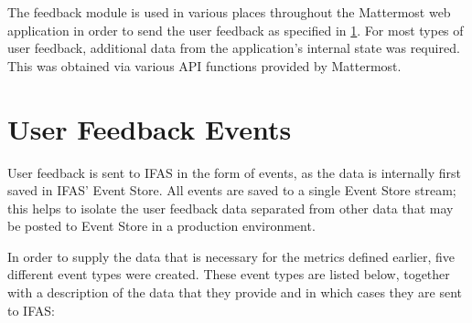 The feedback module is used in various places throughout the Mattermost web application in order to send the user feedback as specified in \cref{sec:design:event-structure}.
For most types of user feedback, additional data from the application's internal state was required.
This was obtained via various \ac{API} functions provided by Mattermost.

\section{User Feedback Events}
\label{sec:design:event-structure}

User feedback is sent to \ac{IFAS} in the form of events, as the data is internally first saved in \ac{IFAS}' Event Store.
All events are saved to a single Event Store stream; this helps to isolate the user feedback data separated from other data that may be posted to Event Store in a production environment.

In order to supply the data that is necessary for the metrics defined earlier, five different event types were created.
These event types are listed below, together with a description of the data that they provide and in which cases they are sent to \ac{IFAS}:

